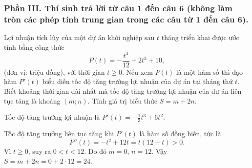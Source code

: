 \subsubsection*{Phần III. Thí sinh trả lời từ câu 1 đến câu 6 (không làm tròn các phép tính trung gian trong các câu từ 1 đến câu 6).}
\setcounter{bt}{0}
\begin{baitap}
	Lợi nhuận tích lũy của một dự án khởi nghiệp sau $t$ tháng triển khai được ước tính bằng công thức $$P(t) = -\frac{t^4}{12} + 2t^3 + 10,$$ (đơn vị: triệu đồng), với thời gian $t \ge 0$. Nếu xem $P(t)$ là một hàm số thì đạo hàm $P'(t)$ biểu diễn tốc độ tăng trưởng lợi nhuận của dự án tại tháng thứ $t$. Biết khoảng thời gian dài nhất mà tốc độ tăng trưởng lợi nhuận của dự án liên tục tăng là khoảng $(m; n)$. Tính giá trị biểu thức $S = m + 2n$.
	\begin{traloi}
		Tốc độ tăng trưởng lợi nhuận là
		$P'(t)=-\frac{1}{3}t^3+6t^2$.
		
		Tốc độ tăng trưởng liên tục tăng khi $P'(t)$ là hàm số đồng biến, tức là
		\[
		P''(t)=-t^2+12t=t(12-t)>0.
		\]
		Vì $t\geq0$, suy ra $0<t<12$. Do đó $m=0$, $n=12$.	Vậy $S=m+2n=0+2\cdot12=24$.
	\end{traloi}
\end{baitap}


